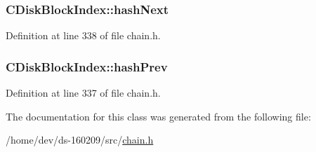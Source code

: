 \subsubsection[{hash\+Next}]{ C\+Disk\+Block\+Index\+::hash\+Next}\label{class_c_disk_block_index_a0dda572f44335a5317de18001c3594a8}


Definition at line 338 of file chain.\+h.

\hypertarget{class_c_disk_block_index_a3a1730201a8523fb947c4d4f632a4212}{}
\subsubsection[{hash\+Prev}]{ C\+Disk\+Block\+Index\+::hash\+Prev}\label{class_c_disk_block_index_a3a1730201a8523fb947c4d4f632a4212}


Definition at line 337 of file chain.\+h.



The documentation for this class was generated from the following file\+:\begin{DoxyCompactItemize}
\item 
/home/dev/ds-\/160209/src/\hyperlink{chain_8h}{chain.\+h}\end{DoxyCompactItemize}
